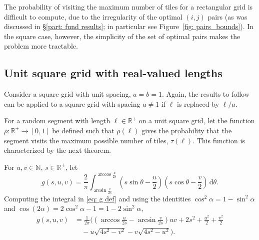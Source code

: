 \documentclass[12pt, a4paper]{article}
\newcommand{\diff}{\,\mathrm d}
\newcommand{\funt}{\tau} %
\newcommand{\probmax}{\rho} %
\newcommand{\len}{\ell} %
\newcommand{\genvar}{s}
\begin{document}
The probability of visiting the maximum number of tiles for a rectangular grid is difficult to compute, due to the irregularity of the optimal $(i,j)$ pairs (as was discussed in \S\ref{part: fund results}; in particular see Figure~\ref{fig: pairs_bounds}). In the square case, however, the simplicity of the set of optimal pairs makes the problem more tractable.


\subsection{Unit square grid with real-valued lengths}
\label{part: probmax: unit square grid, real lengths}

Consider a square grid with unit spacing, $a=b=1$. Again, the results to follow can be applied to a square grid with spacing $a \neq 1$ if $\len$ is replaced by $\len/a$.

For a random segment with length $\len \in \mathbb R^+$ on a unit square grid, let the function $\probmax: \mathbb R^+ \to [0,1]$ be defined such that $\probmax(\len)$ gives the probability that the segment visits the maximum possible number of tiles, $\funt(\len)$. This function is characterized by the next theorem.

For $u, v \in \mathbb N$, $\genvar \in \mathbb R^+$, let
\begin{equation}
\label{eq: g def}
g(\genvar, u, v) = \frac 2 \pi \int_{\arcsin \frac v {2\genvar}}^{\arccos \frac u {2\genvar}} \left( \genvar \sin \theta - \frac u 2 \right) \left( \genvar \cos \theta - \frac v 2 \right) \diff \theta.
\end{equation}
Computing the integral in \eqref{eq: g def} and using the identities $\cos^2 \alpha = 1-\sin^2 \alpha$ and $\cos(2\alpha) = 2\cos^2\alpha-1 = 1 - 2\sin^2\alpha$,
\begin{equation}
\label{eq: g fin}
\begin{split}
g(\genvar, u, v) &= \frac 1 {2\pi} \biggl(
\left(\arccos\frac{u}{2\genvar}-\arcsin\frac{v}{2\genvar}\right) u v + 2\genvar^2 + \frac{u^2} 2 + \frac{v^2} 2 \\
& \quad  - u \sqrt{4\genvar^2-v^2} - v \sqrt{4\genvar^2-u^2} \biggr).
\end{split}
\end{equation}
\end{document}
